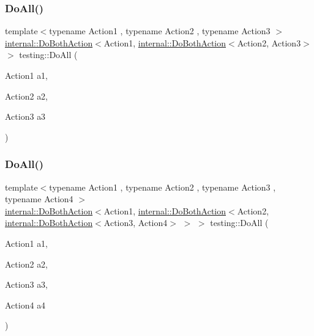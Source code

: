 \mbox{\label{namespacetesting_ad6a3ce5e229120ea287286a86394d712}} 
\subsubsection{\texorpdfstring{DoAll()}{DoAll()}\hspace{0.1cm}{\footnotesize\ttfamily [2/10]}}
{\footnotesize\ttfamily template$<$typename Action1 , typename Action2 , typename Action3 $>$ \\
\mbox{\hyperlink{classtesting_1_1internal_1_1_do_both_action}{internal\+::\+Do\+Both\+Action}}$<$Action1, \mbox{\hyperlink{classtesting_1_1internal_1_1_do_both_action}{internal\+::\+Do\+Both\+Action}}$<$Action2, Action3$>$ $>$ testing\+::\+Do\+All (\begin{DoxyParamCaption}\item[{Action1}]{a1,  }\item[{Action2}]{a2,  }\item[{Action3}]{a3 }\end{DoxyParamCaption})\hspace{0.3cm}{\ttfamily [inline]}}

\mbox{\label{namespacetesting_a790ce08c80a1f8ececa0f2a4f678247c}} 
\subsubsection{\texorpdfstring{DoAll()}{DoAll()}\hspace{0.1cm}{\footnotesize\ttfamily [3/10]}}
{\footnotesize\ttfamily template$<$typename Action1 , typename Action2 , typename Action3 , typename Action4 $>$ \\
\mbox{\hyperlink{classtesting_1_1internal_1_1_do_both_action}{internal\+::\+Do\+Both\+Action}}$<$Action1, \mbox{\hyperlink{classtesting_1_1internal_1_1_do_both_action}{internal\+::\+Do\+Both\+Action}}$<$Action2, \mbox{\hyperlink{classtesting_1_1internal_1_1_do_both_action}{internal\+::\+Do\+Both\+Action}}$<$Action3, Action4$>$ $>$ $>$ testing\+::\+Do\+All (\begin{DoxyParamCaption}\item[{Action1}]{a1,  }\item[{Action2}]{a2,  }\item[{Action3}]{a3,  }\item[{Action4}]{a4 }\end{DoxyParamCaption})\hspace{0.3cm}{\ttfamily [inline]}}

